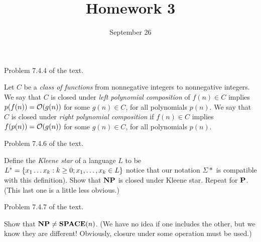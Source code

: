 \documentclass{../math167}
\title{Homework 3}
\author{}
\date{September 26}
\begin{document}
\begin{problems}
\item Problem 7.4.4 of the text.
  \begin{book}
    Let \(C\) be a \emph{class of functions} from nonnegative integers
    to nonnegative integers.  We say that \(C\) is closed under
    \emph{left polynomial composition} of \(f(n) \in C\) implies
    \(p(f(n)) = \O(g(n))\) for some \(g(n) \in C\), for all
    polynomials \(p(n)\).  We say that \(C\) is closed under
    \emph{right polynomial composition} if \(f(n) \in C\) implies
    \(f(p(n)) = \O(g(n))\) for some \(g(n) \in C\), for all
    polynomials \(p(n)\).
  \end{book}

  \begin{solution}
  \end{solution}

\item Problem 7.4.6 of the text.
  \begin{book}
    Define the \emph{Kleene star} of a language \(L\) to be
    \(L^* = \set{x_1 \dots x_k : k \ge 0; x_1, \dots, x_k \in L}\)
    notice that our notation \(\Sigma*\) is compatible with this
    definition).  Show that \(\NP\) is closed under Kleene star.
    Repeat for \(\P\).  (This last one is a little less obvious.)
  \end{book}

  \begin{solution}
  \end{solution}

\item Problem 7.4.7 of the text.
  \begin{book}
    Show that \(\NP \ne \SPACE(n)\).  (We have no idea if one includes
    the other, but we know they are different!  Obviously, closure
    under some operation must be used.)
  \end{book}

  \begin{solution}
  \end{solution}

\end{problems}
\end{document}
